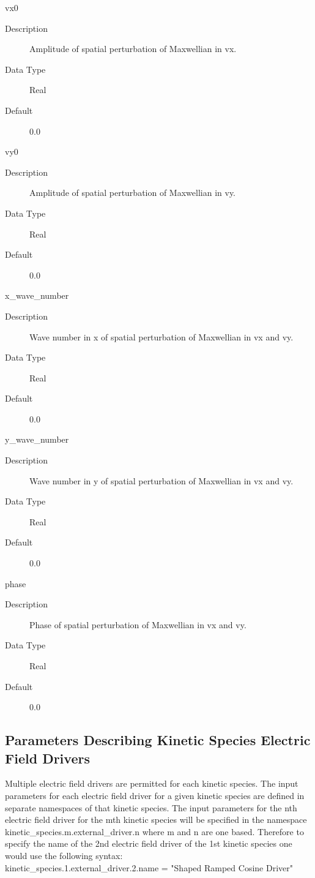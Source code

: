 \documentclass[11pt]{amsart}
\begin{document}
vx0
\begin{description}
\item [Description] Amplitude of spatial perturbation of Maxwellian in vx.
\item [Data Type] Real
\item [Default] 0.0
\end{description}

vy0
\begin{description}
\item [Description] Amplitude of spatial perturbation of Maxwellian in vy.
\item [Data Type] Real
\item [Default] 0.0
\end{description}

x\_wave\_number
\begin{description}
\item [Description] Wave number in x of spatial perturbation of Maxwellian in
vx and vy.
\item [Data Type] Real
\item [Default] 0.0
\end{description}

y\_wave\_number
\begin{description}
\item [Description] Wave number in y of spatial perturbation of Maxwellian in
vx and vy.
\item [Data Type] Real
\item [Default] 0.0
\end{description}

phase
\begin{description}
\item [Description] Phase of spatial perturbation of Maxwellian in vx and vy.
\item [Data Type] Real
\item [Default] 0.0
\end{description}

\subsection*{Parameters Describing Kinetic Species Electric Field Drivers}
Multiple electric field drivers are permitted for each kinetic species.  The
input parameters for each electric field driver for a given kinetic species are
defined in separate namespaces of that kinetic species.  The input parameters
for the nth electric field driver for the mth kinetic species will be specified
in the namespace kinetic\_species.m.external\_driver.n where m and n are one
based.  Therefore to specify the name of the 2nd electric field driver of the
1st kinetic species one would use the following syntax: \\
kinetic\_species.1.external\_driver.2.name = "Shaped Ramped Cosine Driver"
\end{document}
